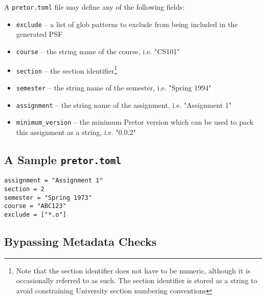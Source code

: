 \documentclass{book}
\begin{document}
A \texttt{pretor.toml} file may define any of the following fields:

\begin{itemize}

	\item \texttt{exclude} -- a list of glob patterns to exclude from being
		included in the generated PSF

	\item \texttt{course} -- the string name of the course, i.e. "CS101"

	\item \texttt{section} -- the section identifier\footnote{Note that the
		section identifier does not have to be numeric, although
		it is occasionally referred to as such. The section identifier
		is stored as a string to avoid constraining University section
		numbering conventions}

	\item \texttt{semester} -- the string name of the semester, i.e.
		"Spring 1994"

	\item \texttt{assignment} -- the string name of the assignment, i.e.
		"Assignment 1"

	\item \texttt{minimum\_version} -- the minimum Pretor version which
		can be used to pack this assignment as a string, i.e. "0.0.2"

\end{itemize}

\subsection{A Sample \texttt{pretor.toml}}

\begin{verbatim}
assignment = "Assignment 1"
section = 2
semester = "Spring 1973"
course = "ABC123"
exclude = ["*.o"]
\end{verbatim}

\subsection{Bypassing Metadata Checks}


\end{document}
